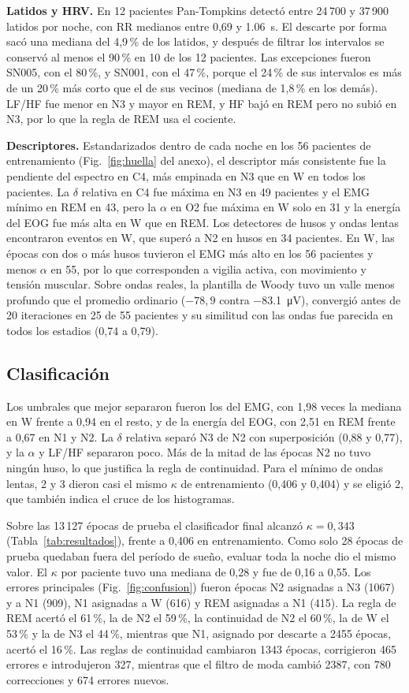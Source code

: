 \textbf{Latidos y HRV.} En 12 pacientes Pan-Tompkins detectó entre 24\,700 y 37\,900 latidos por noche, con RR medianos entre 0,69 y \SI{1,06}{\second}. El descarte por forma sacó una mediana del 4,9\,\% de los latidos, y después de filtrar los intervalos se conservó al menos el 90\,\% en 10 de los 12 pacientes. Las excepciones fueron SN005, con el 80\,\%, y SN001, con el 47\,\%, porque el 24\,\% de sus intervalos es más de un 20\,\% más corto que el de sus vecinos (mediana de 1,8\,\% en los demás). LF/HF fue menor en N3 y mayor en REM, y HF bajó en REM pero no subió en N3, por lo que la regla de REM usa el cociente.

\textbf{Descriptores.} Estandarizados dentro de cada noche en los 56 pacientes de entrenamiento (Fig.~\ref{fig:huella} del anexo), el descriptor más consistente fue la pendiente del espectro en C4, más empinada en N3 que en W en todos los pacientes. La $\delta$ relativa en C4 fue máxima en N3 en 49 pacientes y el EMG mínimo en REM en 43, pero la $\alpha$ en O2 fue máxima en W solo en 31 y la energía del EOG fue más alta en W que en REM. Los detectores de husos y ondas lentas encontraron eventos en W, que superó a N2 en husos en 34 pacientes. En W, las épocas con dos o más husos tuvieron el EMG más alto en los 56 pacientes y menos $\alpha$ en 55, por lo que corresponden a vigilia activa, con movimiento y tensión muscular. Sobre ondas reales, la plantilla de Woody tuvo un valle menos profundo que el promedio ordinario ($-78{,}9$ contra \SI{-83,1}{\micro\volt}), convergió antes de 20 iteraciones en 25 de 55 pacientes y su similitud con las ondas fue parecida en todos los estadios (0,74 a 0,79).

\subsection{Clasificación}
Los umbrales que mejor separaron fueron los del EMG, con 1,98 veces la mediana en W frente a 0,94 en el resto, y de la energía del EOG, con 2,51 en REM frente a 0,67 en N1 y N2. La $\delta$ relativa separó N3 de N2 con superposición (0,88 y 0,77), y la $\alpha$ y LF/HF separaron poco. Más de la mitad de las épocas N2 no tuvo ningún huso, lo que justifica la regla de continuidad. Para el mínimo de ondas lentas, 2 y 3 dieron casi el mismo $\kappa$ de entrenamiento (0,406 y 0,404) y se eligió 2, que también indica el cruce de los histogramas.

Sobre las 13\,127 épocas de prueba el clasificador final alcanzó $\kappa = 0{,}343$ (Tabla~\ref{tab:resultados}), frente a 0,406 en entrenamiento. Como solo 28 épocas de prueba quedaban fuera del período de sueño, evaluar toda la noche dio el mismo valor. El $\kappa$ por paciente tuvo una mediana de 0,28 y fue de 0,16 a 0,55. Los errores principales (Fig.~\ref{fig:confusion}) fueron épocas N2 asignadas a N3 (1067) y a N1 (909), N1 asignadas a W (616) y REM asignadas a N1 (415). La regla de REM acertó el 61\,\%, la de N2 el 59\,\%, la continuidad de N2 el 60\,\%, la de W el 53\,\% y la de N3 el 44\,\%, mientras que N1, asignado por descarte a 2455 épocas, acertó el 16\,\%. Las reglas de continuidad cambiaron 1343 épocas, corrigieron 465 errores e introdujeron 327, mientras que el filtro de moda cambió 2387, con 780 correcciones y 674 errores nuevos.

